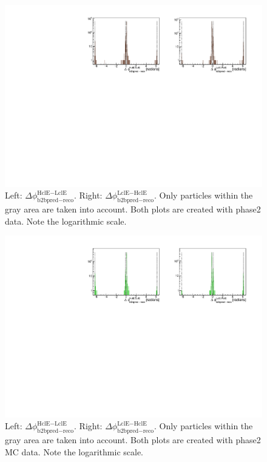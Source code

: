 \documentclass[a4paper,11pt,twosided,final,german,openbib,pdftex,listof=totoc,bibliography=totoc]{scrbook}
\begin{document}
\begin{appendix}
\begin{figure}[h!]
	\centering
	\includegraphics[width=\textwidth]{Plots/master/sb2b_Data_0.pdf}
	\caption[b2bClusterPhi - clusterPhi For Data (Whole Range)]{Left: $\Delta \phi _{\textrm{b2bpred} - \textrm{reco}}^{\textrm{HclE}-\textrm{LclE}}$. Right:  $\Delta \phi _{\textrm{b2bpred} - \textrm{reco}}^{\textrm{LclE}-\textrm{HclE}}$. Only particles within the gray area are taken into account. Both plots are created with phase2 data. Note the logarithmic scale.}
	\label{fig:b2bData_Whole}
\end{figure}






\begin{figure}[!htbp]
	\centering
	\includegraphics[width=\textwidth]{Plots/master/sb2b_MC_0.pdf}
	\caption[b2bClusterPhi - clusterPhi For MC (Whole Range)]{Left: $\Delta \phi _{\textrm{b2bpred} - \textrm{reco}}^{\textrm{HclE}-\textrm{LclE}}$. Right:  $\Delta \phi _{\textrm{b2bpred} - \textrm{reco}}^{\textrm{LclE}-\textrm{HclE}}$. Only particles within the gray area are taken into account. Both plots are created with phase2 MC data. Note the logarithmic scale.}
	\label{fig:b2bMC_Whole}
\end{figure}
\newpage




\end{appendix}
\end{document}

